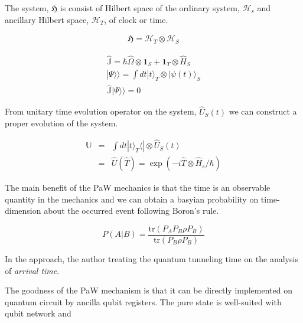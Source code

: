 The system, $\mathfrak{H}$ is consist of Hilbert space of the ordinary system, $\mathcal{H}_s$ and ancillary Hilbert space, 
$\mathcal{H}_T$, of clock or time.

\begin{eqnarray}
    \mathfrak{H} = \mathcal{H}_T \otimes \mathcal{H}_S
\end{eqnarray}

\begin{eqnarray}
    \hat{\mathbb{J}}  = \hbar \hat{\Omega} \otimes \mathbf{1}_S + \mathbf{1}_T \otimes \hat{H}_S \\
    |\Psi \rangle \rangle = \int dt | t \rangle_T \otimes | \psi(t) \rangle_S \\
    \hat{\mathbb{J}} | \Psi \rangle\rangle = 0 
\end{eqnarray}

From unitary time evolution operator on the system, $\hat{U}_S(t)$ we can construct a proper evolution of the system.

\begin{eqnarray}
    \mathbb{U} &=& \int dt | t \rangle_T \langle| \otimes \hat{U}_S(t) \\
    &=& \hat{U}(\hat{T}) = \exp(- i \hat{T} \otimes \hat{H}_s /\hbar) 
\end{eqnarray}


The main benefit of the PaW mechanics is that the time is an observable quantity in the mechanics and 
we can obtain a basyian probability on time-dimension about the occurred event following Boron's rule.

\begin{equation}
    P(A |B) = \frac{\mbox{tr}(P_A P_B \rho P_B) }{\mbox{tr}(P_B \rho P_B)}
\end{equation}

In the approach, the author treating the quantum tunneling time on the analysis of \textit{arrival time}.

The goodness of the PaW mechanism is that it can be directly implemented on quantum circuit by ancilla qubit registers.
The pure state is well-suited with qubit network and 
